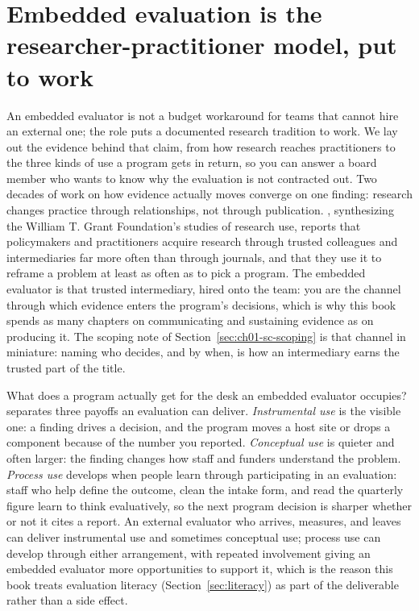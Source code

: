 \documentclass[
    a4paper,
    fontsize=10pt,
    twoside=true,
    numbers=noenddot,
]{kaobook}
\begin{document}
\section{Embedded evaluation is the researcher-practitioner model, put to work}\label{sec:ch01-rpp}
An embedded evaluator is not a budget workaround for teams that cannot hire an external one; the role puts a documented research tradition to work. We lay out the evidence behind that claim, from how research reaches practitioners to the three kinds of use a program gets in return, so you can answer a board member who wants to know why the evaluation is not contracted out. Two decades of work on how evidence actually moves converge on one finding: research changes practice through relationships, not through publication. \textcite{tseng2012uses}, synthesizing the William T. Grant Foundation's studies of research use, reports that policymakers and practitioners acquire research through trusted colleagues and intermediaries far more often than through journals, and that they use it to reframe a problem at least as often as to pick a program. The embedded evaluator is that trusted intermediary, hired onto the team: you are the channel through which evidence enters the program's decisions, which is why this book spends as many chapters on communicating and sustaining evidence as on producing it. The scoping note of Section~\ref{sec:ch01-sc-scoping} is that channel in miniature: naming who decides, and by when, is how an intermediary earns the trusted part of the title.

What does a program actually get for the desk an embedded evaluator occupies? \textcite{patton2008utilization} separates three payoffs an evaluation can deliver. \emph{Instrumental use} is the visible one: a finding drives a decision, and the program moves a host site or drops a component because of the number you reported. \emph{Conceptual use} is quieter and often larger: the finding changes how staff and funders understand the problem. \emph{Process use} develops when people learn through participating in an evaluation: staff who help define the outcome, clean the intake form, and read the quarterly figure learn to think evaluatively, so the next program decision is sharper whether or not it cites a report. An external evaluator who arrives, measures, and leaves can deliver instrumental use and sometimes conceptual use; process use can develop through either arrangement, with repeated involvement giving an embedded evaluator more opportunities to support it, which is the reason this book treats evaluation literacy (Section~\ref{sec:literacy}) as part of the deliverable rather than a side effect.
\end{document}
